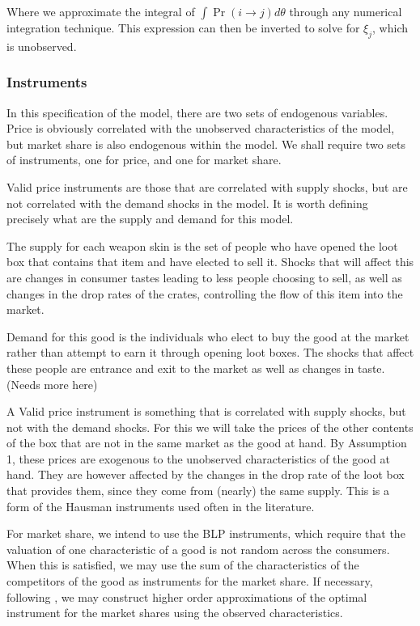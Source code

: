 \documentclass[12pt]{paper}
\begin{document}
Where we approximate the integral of $\int \Pr( i \rightarrow j)d\theta$ through any
numerical integration technique. This expression can then be inverted
to solve for $\xi_j$, which is unobserved.

\subsubsection{Instruments}

In this specification of the model, there are two sets of endogenous
variables. Price is obviously correlated with the unobserved
characteristics of the model, but market share is also endogenous
within the model. We shall require two sets of instruments, one for
price, and one for market share.

Valid price instruments are those that are correlated with supply
shocks, but are not correlated with the demand shocks in the
model. It is worth defining precisely what are the supply and demand
for this model.

The supply for each weapon skin is the set of people who have opened
the loot box that contains that item and have elected to sell
it. Shocks that will affect this are changes in consumer tastes
leading to less people choosing to sell, as well as changes in the
drop rates of the crates, controlling the flow of this item into the
market.

Demand for this good is the individuals who elect to buy the good at
the market rather than attempt to earn it through opening loot
boxes. The shocks that affect these people are entrance and exit to
the market as well as changes in taste. (Needs more here)

A Valid price instrument is something that is correlated with supply
shocks, but not with the demand shocks. For this we will take the
prices of the other contents of the box that are not in the same
market as the good at hand. By Assumption 1, these prices are
exogenous to the unobserved characteristics of the good at hand. They
are however affected by the changes in the drop rate of the loot box
that provides them, since they come from (nearly) the same
supply. This is a form of the Hausman instruments used often in the
literature.

For market share, we intend to use the BLP instruments, which require
that the valuation of one characteristic of a good is not random
across the consumers. When this is satisfied, we may use the sum of
the characteristics of the competitors of the good as instruments for
the market share. If necessary, following \cite{OptimalBLPInstrument}, we
may construct higher order approximations of the optimal instrument
for the market shares using the observed characteristics.
\end{document}
